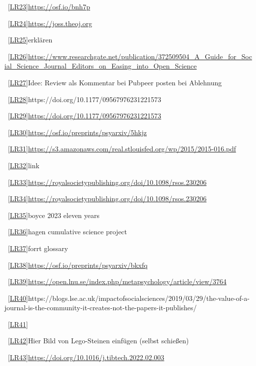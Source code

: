 \documentclass[
  letterpaper,
  DIV=11,
  numbers=noendperiod]{scrreprt}
\begin{document}
~\hyperref[_msoanchor_23]{{[}LR23{]}}\url{https://osf.io/bnh7p}

~\hyperref[_msoanchor_24]{{[}LR24{]}}\url{https://joss.theoj.org}

~\hyperref[_msoanchor_25]{{[}LR25{]}}erklären

~\hyperref[_msoanchor_26]{{[}LR26{]}}\url{https://www.researchgate.net/publication/372509504_A_Guide_for_Social_Science_Journal_Editors_on_Easing_into_Open_Science}

~\hyperref[_msoanchor_27]{{[}LR27{]}}Idee: Review als Kommentar bei
Pubpeer posten bei Ablehnung

~\hyperref[_msoanchor_28]{{[}LR28{]}}https://doi.org/10.1177/09567976231221573

~\hyperref[_msoanchor_29]{{[}LR29{]}}\url{https://doi.org/10.1177/09567976231221573}

~\hyperref[_msoanchor_30]{{[}LR30{]}}\url{https://osf.io/preprints/psyarxiv/5hkjz}

~\hyperref[_msoanchor_31]{{[}LR31{]}}\url{https://s3.amazonaws.com/real.stlouisfed.org/wp/2015/2015-016.pdf}

~\hyperref[_msoanchor_32]{{[}LR32{]}}link

~\hyperref[_msoanchor_33]{{[}LR33{]}}\url{https://royalsocietypublishing.org/doi/10.1098/rsos.230206}

~\hyperref[_msoanchor_34]{{[}LR34{]}}\url{https://royalsocietypublishing.org/doi/10.1098/rsos.230206}

~\hyperref[_msoanchor_35]{{[}LR35{]}}boyce 2023 eleven years

~\hyperref[_msoanchor_36]{{[}LR36{]}}hagen cumulative science project

~\hyperref[_msoanchor_37]{{[}LR37{]}}forrt glossary

~\hyperref[_msoanchor_38]{{[}LR38{]}}\url{https://osf.io/preprints/psyarxiv/bkxfq}

~\hyperref[_msoanchor_39]{{[}LR39{]}}\url{https://open.lnu.se/index.php/metapsychology/article/view/3764}

~\hyperref[_msoanchor_40]{{[}LR40{]}}https://blogs.lse.ac.uk/impactofsocialsciences/2019/03/29/the-value-of-a-journal-is-the-community-it-creates-not-the-papers-it-publishes/

~\hyperref[_msoanchor_41]{{[}LR41{]}}

~\hyperref[_msoanchor_42]{{[}LR42{]}}Hier Bild von Lego-Steinen einfügen
(selbst schießen)

~\hyperref[_msoanchor_43]{{[}LR43{]}}\url{https://doi.org/10.1016/j.tibtech.2022.02.003}
\end{document}
